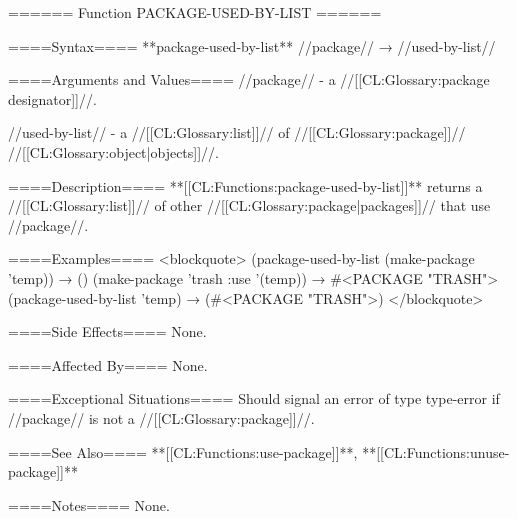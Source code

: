 ====== Function PACKAGE-USED-BY-LIST ======

====Syntax====
**package-used-by-list** //package// → //used-by-list//

====Arguments and Values====
//package// - a //[[CL:Glossary:package designator]]//.

//used-by-list// - a //[[CL:Glossary:list]]// of //[[CL:Glossary:package]]// //[[CL:Glossary:object|objects]]//.

====Description====
**[[CL:Functions:package-used-by-list]]** returns a //[[CL:Glossary:list]]// of other //[[CL:Glossary:package|packages]]// that use //package//.

====Examples====
<blockquote> (package-used-by-list (make-package 'temp)) → () (make-package 'trash :use '(temp)) → #<PACKAGE "TRASH"> (package-used-by-list 'temp) → (#<PACKAGE "TRASH">) </blockquote>

====Side Effects====
None.

====Affected By====
None.

====Exceptional Situations====
Should signal an error of type type-error if //package// is not a //[[CL:Glossary:package]]//.

====See Also====
**[[CL:Functions:use-package]]**, **[[CL:Functions:unuse-package]]**

====Notes====
None.

